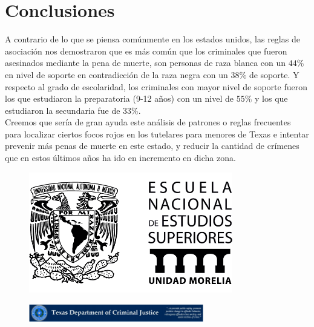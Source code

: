 \documentclass[sigconf]{acmart}
\begin{document}
\section{Conclusiones}
A contrario de lo que se piensa comúnmente en los estados unidos, las reglas de asociación nos demostraron que es más común que los criminales que fueron asesinados mediante la pena de muerte, son personas de raza blanca con un $44\%$ en nivel de soporte en contradicción de la raza negra con un $38\%$ de soporte. Y respecto al grado de escolaridad, los criminales con mayor nivel de soporte fueron los que estudiaron la preparatoria (9-12 años) con un nivel de $55\%$ y los que estudiaron la secundaria fue de $33\%$.\\ Creemos que sería de gran ayuda este análisis de patrones o reglas frecuentes para localizar ciertos focos rojos en los tutelares para menores de Texas e intentar prevenir más penas de muerte en este estado, y reducir la cantidad de crímenes que en estos últimos años ha ido en incremento en dicha zona.\\

\begin{figure}[ht!]
  \centering
  \includegraphics[width=3.5in]{enes.png}
\end{figure}

\begin{figure}[ht!]
  \centering
  \includegraphics[width=3.0in]{C.PNG}
\end{figure}


{}

\end{document}
